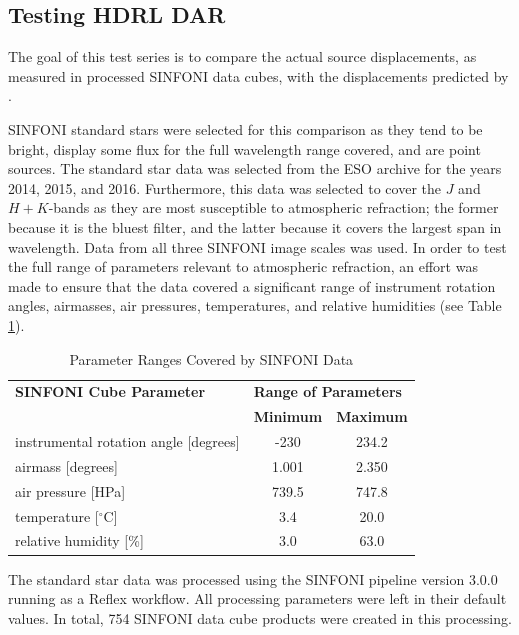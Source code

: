 \subsection{Testing HDRL DAR}
\label{chap:testing_DAR}

The goal of this test series is to compare the actual source displacements, as measured in processed SINFONI
data cubes, with the displacements predicted by \hdrldar.

SINFONI standard stars were selected for this comparison as they tend to be bright, display some flux for the full
wavelength range covered, and are point sources.   The standard star data was selected from the ESO archive for the years 2014, 2015, and 2016.  
Furthermore, this data was selected to cover the $J$ and $H + K$-bands as they are most susceptible to 
atmospheric refraction; the former because it is the bluest filter, and the latter because it covers the 
largest span in wavelength. Data from all three SINFONI image scales was used. In order to test the full range 
of parameters relevant to atmospheric refraction, an effort was made to ensure that the data covered a 
significant range of instrument rotation angles, airmasses, air pressures, temperatures, and relative humidities
(see Table \ref{fig:SINFONI_data}).

\begin{table}[ht]
\caption{Parameter Ranges Covered by SINFONI Data}
\begin{center}
\begin{tabular}{ l c c }
{\bf SINFONI Cube Parameter}			& \multicolumn{2}{l}{{\bf Range of Parameters}}  \\
  								& {\bf Minimum}	& {\bf Maximum} \\
 instrumental rotation angle [degrees]	& -230			& 234.2	   \\				
 airmass [degrees] 					& 1.001			& 2.350	   \\
 air pressure [HPa]                 			& 739.5   			& 747.8     \\
 temperature [$^\circ$C]      			& 3.4				& 20.0       \\
  relative humidity [\%]             			& 3.0    			& 63.0 	   \\
\end{tabular}
\end{center}
\label{fig:SINFONI_data}
\end{table}

The standard star data was processed using the SINFONI pipeline version 3.0.0 running as a Reflex workflow.  All processing parameters were left
in their default values.   In total, 754 SINFONI data cube products were created in this processing.    

